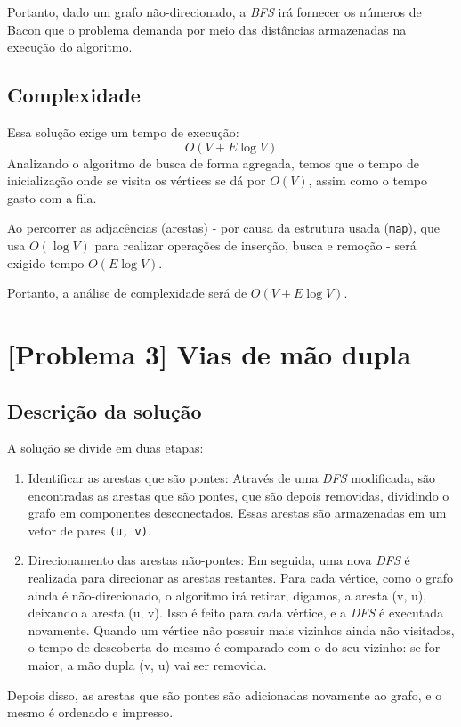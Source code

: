 \documentclass[12pt, letterpaper]{article}
\begin{document}
            Portanto, dado um grafo não-direcionado, a \emph{BFS} irá fornecer os números de Bacon que o problema demanda por meio das distâncias armazenadas na execução do algoritmo.

        \subsection{Complexidade}
            Essa solução exige um tempo de execução:
            $$ O(V + E\log{V}) $$
            Analizando o algoritmo de busca de forma agregada, temos que o tempo de inicialização onde se visita os vértices se dá por $O(V)$, assim como o tempo gasto com a fila.

            Ao percorrer as adjacências (arestas) - por causa da estrutura usada (\verb|map|), que usa $O(\log{V})$ para realizar operações de inserção, busca e remoção - será exigido tempo $O(E\log{V})$.

            Portanto, a análise de complexidade será de $O(V + E\log{V})$.
    \section{[Problema 3] Vias de mão dupla}
        \subsection{Descrição da solução}
            A solução se divide em duas etapas:
            \begin{enumerate}
                \item Identificar as arestas que são pontes:
                    Através de uma \emph{DFS} modificada, são encontradas as arestas que são pontes, que são depois removidas, dividindo o grafo em componentes desconectados. Essas arestas são armazenadas em um vetor de pares \verb|(u, v)|.
                \item Direcionamento das arestas não-pontes:
                    Em seguida, uma nova \emph{DFS} é realizada para direcionar as arestas restantes. Para cada vértice, como o grafo ainda é não-direcionado, o algoritmo irá retirar, digamos, a aresta (v, u), deixando a aresta (u, v). Isso é feito para cada vértice, e a \emph{DFS} é executada novamente.
                    Quando um vértice não possuir mais vizinhos ainda não visitados, o tempo de descoberta do mesmo é comparado com o do seu vizinho: se for maior, a mão dupla (v, u) vai ser removida.
            \end{enumerate}
            Depois disso, as arestas que são pontes são adicionadas novamente ao grafo, e o mesmo é ordenado e impresso.
\end{document}
